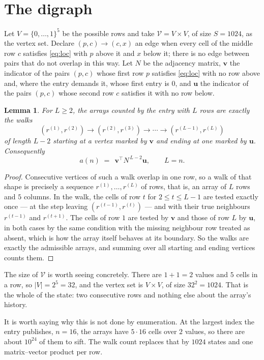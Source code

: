 \documentclass[11pt,a4paper]{article}
\theoremstyle{plain}
\newtheorem{lemma}[theorem]{Lemma}
\theoremstyle{definition}
\begin{document}
\section{The digraph}

Let $V=\{0,\dots,1\}^{5}$ be the possible rows and take
$\mathcal V=V\times V$, of size $S=1024$, as the vertex set. Declare $(p,c)\to(c,x)$ an edge
when every cell of the middle row $c$ satisfies \eqref{eq:loc} with $p$ above it and $x$
below it; there is no edge between pairs that do not overlap in this way. Let $N$ be the
adjacency matrix, $\mathbf{v}$ the indicator of the pairs $(p,c)$ whose first row $p$
satisfies \eqref{eq:loc} with no row above and, where the entry demands it, whose first entry is $0$, and $\mathbf{u}$ the indicator of
the pairs $(p,c)$ whose second row $c$ satisfies it with no row below.

\begin{lemma}\label{lem:walk}
For $L\ge2$, the arrays counted by the entry with $L$ rows are exactly the walks
\[
(r^{(1)},r^{(2)})\to(r^{(2)},r^{(3)})\to\cdots\to(r^{(L-1)},r^{(L)})
\]
of length $L-2$ starting at a vertex marked by $\mathbf{v}$ and ending at one marked by
$\mathbf{u}$. Consequently
\[
a(n)\;=\;\,\mathbf{v}^{\!\top}N^{\,L-2}\mathbf{u},\qquad L=n .
\]
\end{lemma}

\begin{proof}
Consecutive vertices of such a walk overlap in one row, so a walk of that shape is
precisely a sequence $r^{(1)},\dots,r^{(L)}$ of rows, that is, an array of $L$ rows
and $5$ columns. In the walk, the cells of row $t$ for $2\le t\le L-1$ are tested
exactly once --- at the step leaving $(r^{(t-1)},r^{(t)})$ --- and with their true
neighbours $r^{(t-1)}$ and $r^{(t+1)}$. The cells of row $1$ are tested by
$\mathbf{v}$ and those of row $L$ by $\mathbf{u}$, in both cases by the same condition
with the missing neighbour row treated as absent, which is how the array itself behaves at
its boundary. So the walks are exactly the admissible arrays, and summing over all starting
and ending vertices counts them.
\end{proof}


The size of $\mathcal V$ is worth seeing concretely. There are $1+1=2$ values
and $5$ cells in a row, so $|V|=2^{5}=32$, and the vertex set is
$V\times V$, of size $32^2=1024$. That is the whole of the state: two consecutive
rows and nothing else about the array's history.

It is worth saying why this is not done by enumeration. At the largest index the entry
publishes, $n=16$, the arrays have $5\cdot16$ cells over
$2$ values, so there are about $10^{24}$ of them to sift. The
walk count replaces that by $1024$ states and one matrix--vector product per row.
\end{document}

